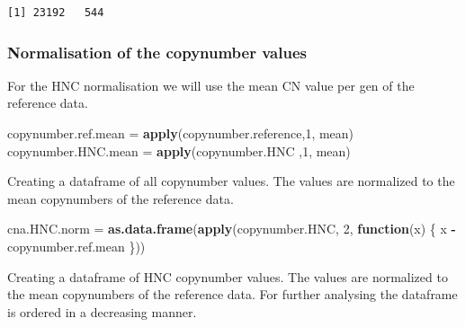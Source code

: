\documentclass[]{article}
\newenvironment{Shaded}{\begin{snugshade}}{\end{snugshade}}
\newcommand{\KeywordTok}[1]{\textcolor[rgb]{0.13,0.29,0.53}{\textbf{#1}}}
\newcommand{\DataTypeTok}[1]{\textcolor[rgb]{0.13,0.29,0.53}{#1}}
\newcommand{\DecValTok}[1]{\textcolor[rgb]{0.00,0.00,0.81}{#1}}
\newcommand{\StringTok}[1]{\textcolor[rgb]{0.31,0.60,0.02}{#1}}
\newcommand{\OtherTok}[1]{\textcolor[rgb]{0.56,0.35,0.01}{#1}}
\newcommand{\ControlFlowTok}[1]{\textcolor[rgb]{0.13,0.29,0.53}{\textbf{#1}}}
\newcommand{\OperatorTok}[1]{\textcolor[rgb]{0.81,0.36,0.00}{\textbf{#1}}}
\newcommand{\NormalTok}[1]{#1}
\begin{document}
\begin{verbatim}
[1] 23192   544
\end{verbatim}

\subsubsection{Normalisation of the copynumber
values}\label{normalisation-of-the-copynumber-values}

For the HNC normalisation we will use the mean CN value per gen of the
reference data.

\begin{Shaded}
\begin{Highlighting}[]
\NormalTok{copynumber.ref.mean =}\StringTok{ }\KeywordTok{apply}\NormalTok{(copynumber.reference,}\DecValTok{1}\NormalTok{, mean)}
\NormalTok{copynumber.HNC.mean =}\StringTok{ }\KeywordTok{apply}\NormalTok{(copynumber.HNC ,}\DecValTok{1}\NormalTok{, mean)}
\end{Highlighting}
\end{Shaded}

Creating a dataframe of all copynumber values. The values are normalized
to the mean copynumbers of the reference data.

\begin{Shaded}
\begin{Highlighting}[]
\NormalTok{cna.HNC.norm =}\StringTok{ }\KeywordTok{as.data.frame}\NormalTok{(}\KeywordTok{apply}\NormalTok{(copynumber.HNC, }\DecValTok{2}\NormalTok{, }\ControlFlowTok{function}\NormalTok{(x) \{}
\NormalTok{  x }\OperatorTok{-}\StringTok{ }\NormalTok{copynumber.ref.mean}
\NormalTok{\}))}
\end{Highlighting}
\end{Shaded}

Creating a dataframe of HNC copynumber values. The values are normalized
to the mean copynumbers of the reference data. For further analysing the
dataframe is ordered in a decreasing manner.

\begin{Shaded}
\end{Shaded}
\end{document}

